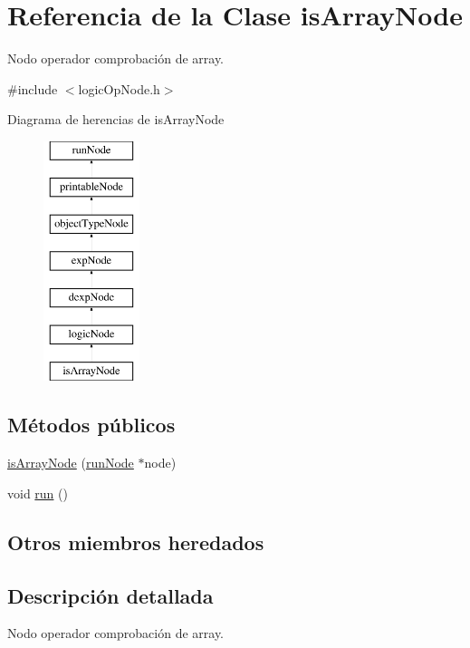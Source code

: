 \hypertarget{classisArrayNode}{\section{Referencia de la Clase is\-Array\-Node}
\label{classisArrayNode}
}


Nodo operador comprobación de array.  




{\ttfamily \#include $<$logic\-Op\-Node.\-h$>$}

Diagrama de herencias de is\-Array\-Node\begin{figure}[H]
\begin{center}
\leavevmode
\includegraphics[height=7.000000cm]{classisArrayNode}
\end{center}
\end{figure}
\subsection*{Métodos públicos}
\begin{DoxyCompactItemize}
\item 
\hyperlink{classisArrayNode_a6cfb9aab95d1aa741bd16a9a40d54d23}{is\-Array\-Node} (\hyperlink{classrunNode}{run\-Node} $\ast$node)
\item 
void \hyperlink{classisArrayNode_a5aaed405734079e49e8bf125d9e476b6}{run} ()
\end{DoxyCompactItemize}
\subsection*{Otros miembros heredados}


\subsection{Descripción detallada}
Nodo operador comprobación de array. 

